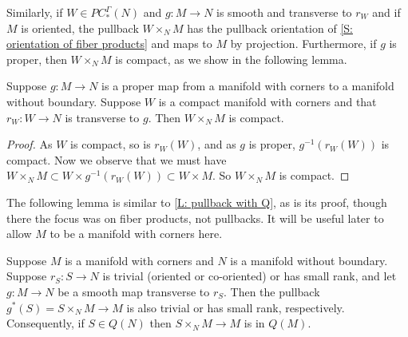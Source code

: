 Similarly, if $W \in PC_*^\Gamma(N)$ and $g \colon M \to N$ is smooth and transverse to $r_W$ and if $M$ is oriented, the pullback $W \times_N M$ has the pullback orientation of \cref{S: orientation of fiber products} and maps to $M$ by projection.
Furthermore, if $g$ is proper, then $W \times_N M$ is compact, as we show in the following lemma.

\begin{lemma}\label{L: compact pullback}
	Suppose $g \colon M \to N$ is a proper map from a manifold with corners to a manifold without boundary.
	Suppose $W$ is a compact manifold with corners and that $r_W \colon W \to N$ is transverse to $g$.
	Then $W \times_N M$ is compact.
\end{lemma}

\begin{proof}
	As $W$ is compact, so is $r_W(W)$, and as $g$ is proper, $g^{-1}(r_W(W))$ is compact.
	Now we observe that we must have $W \times_N M \subset W \times g^{-1}(r_W(W)) \subset W \times M$.
	So $W \times_N M$ is compact.
\end{proof}

The following lemma is similar to \cref{L: pullback with Q}, as is its proof, though there the focus was on fiber products, not pullbacks.
It will be useful later to allow $M$ to be a manifold with corners here.

\begin{comment}
	\red{GBF: Might want to try to combine those into a single lemma somewhere at some point, but it looks like it might be less messy, if a bit redundant, not to.}
\end{comment}

\begin{lemma}\label{L: pullback map Q}
	Suppose $M$ is a manifold with corners and $N$ is a manifold without boundary.
	Suppose $r_S \colon S \to N$ is trivial (oriented or co-oriented) or has small rank, and let $g \colon M \to N$ be a smooth map transverse to $r_S$.
	Then the pullback $g^*(S) = S \times_N M \to M$ is also trivial or has small rank, respectively.
	Consequently, if $S \in Q(N)$ then $S \times_N M \to M$ is in $Q(M)$.
\end{lemma}


